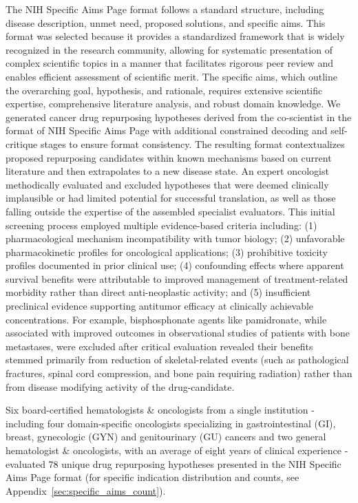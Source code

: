 The NIH Specific Aims Page format follows a standard structure, including disease description, unmet need, proposed solutions, and specific aims. This format was selected because it provides a standardized framework that is widely recognized in the research community, allowing for systematic presentation of complex scientific topics in a manner that facilitates rigorous peer review and enables efficient assessment of scientific merit. The specific aims, which outline the overarching goal, hypothesis, and rationale, requires extensive scientific expertise, comprehensive literature analysis, and robust domain knowledge. We generated cancer drug repurposing hypotheses derived from the co-scientist in the format of NIH Specific Aims Page with additional constrained decoding and self-critique stages to ensure format consistency. The resulting format contextualizes proposed repurposing candidates within known mechanisms based on current literature and then extrapolates to a new disease state. An expert oncologist methodically evaluated and excluded hypotheses that were deemed clinically implausible or had limited potential for successful translation, as well as those falling outside the expertise of the assembled specialist evaluators. This initial screening process employed multiple evidence-based criteria including: (1) pharmacological mechanism incompatibility with tumor biology; (2) unfavorable pharmacokinetic profiles for oncological applications; (3) prohibitive toxicity profiles documented in prior clinical use; (4) confounding effects where apparent survival benefits were attributable to improved management of treatment-related morbidity rather than direct anti-neoplastic activity; and (5) insufficient preclinical evidence supporting antitumor efficacy at clinically achievable concentrations. For example, bisphosphonate agents like pamidronate, while associated with improved outcomes in observational studies of patients with bone metastases, were excluded after critical evaluation revealed their benefits stemmed primarily from reduction of skeletal-related events (such as pathological fractures, spinal cord compression, and bone pain requiring radiation) rather than from disease modifying activity of the drug-candidate. 

Six board-certified hematologists \& oncologists from a single institution - including four domain-specific oncologists specializing in gastrointestinal (GI), breast, gynecologic (GYN) and genitourinary (GU) cancers and two general hematologist \& oncologists, with an average of eight years of clinical experience - evaluated 78 unique drug repurposing hypotheses presented in the NIH Specific Aims Page format (for specific indication distribution and counts, see Appendix~\cref{sec:specific_aims_count}).


